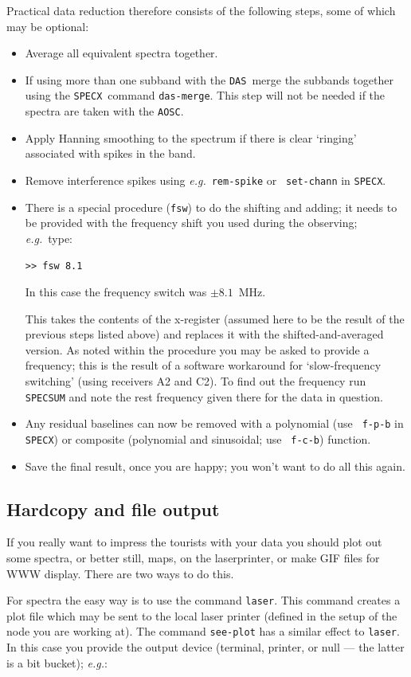 \documentclass[11pt,twoside]{article}
\newcommand{\eg}{{\it e.g.}}
\newcommand{\SPECX}{{\tt SPECX}}
\newcommand{\das}{{\tt DAS}}
\newcommand{\aosc}{{\tt AOSC}}
\begin{document}
Practical data reduction therefore consists of the following steps,
some of which may be optional:
\begin{itemize}
\item
Average all equivalent spectra together.
\item
If using more than one subband with the \das\ merge the subbands
together using the \SPECX\ command {\tt das-merge}. This step will not
be needed if the spectra are taken with the \aosc .
\item
Apply Hanning smoothing to the spectrum if there is clear `ringing'
associated with spikes in the band.
\item
Remove interference spikes using \eg\ {\tt rem-spike} or {\tt
set-chann} in {\SPECX}.
\item
There is a special procedure ({\tt{fsw}}) to do the shifting and
adding; it needs to be provided with the frequency shift you used
during the observing; \eg\ type:

\verb|>> fsw 8.1|

In this case the frequency switch was $\pm8.1$~MHz.

This takes the contents of the x-register (assumed here to be the
result of the previous steps listed above) and replaces it with the
shifted-and-averaged version. As noted within the procedure you may be
asked to provide a frequency; this is the result of a software
workaround for `slow-frequency switching' (using receivers A2 and
C2). To find out the frequency run {\tt SPECSUM} and note the rest
frequency given there for the data in question. 

\item
Any residual baselines can now be removed with a polynomial (use {\tt
f-p-b} in {\SPECX}) or composite (polynomial and sinusoidal; use {\tt
f-c-b}) function.
\item
Save the final result, once you are happy; you won't want to do all
this again.
\end{itemize}



\subsection{Hardcopy and file output}
\label{sec:specx_12}
If you really want to impress the tourists with your data you should
plot out some spectra, or better still, maps, on the laserprinter, or make
GIF files for WWW
display.  There are two ways to do this.

For spectra the easy way is to use the command {\tt laser}.  This command
creates
a plot file which may be sent to the local laser printer (defined in the
setup of the node you are working at).  The command {\tt see-plot} has
a similar effect to {\tt laser}. In this case you provide the output
device (terminal, printer, or null --- the latter is a bit bucket);
\eg :
\end{document}
